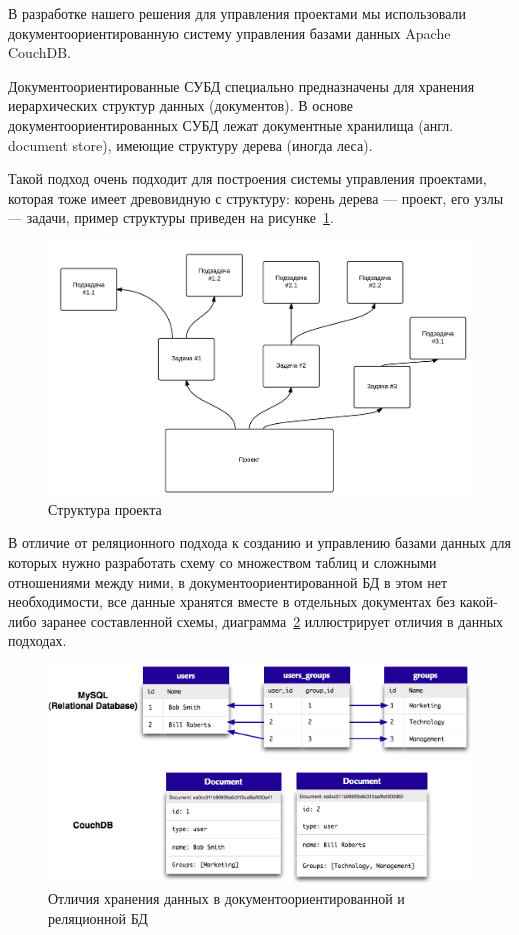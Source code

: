 \documentclass[14pt, a4paper]{extreport}
\begin{document}
В разработке нашего решения для управления проектами мы использовали документоориентированную
систему управления базами данных Apache CouchDB.

Документоориентированные СУБД специально предназначены для хранения иерархических структур
данных (документов). В основе документоориентированных СУБД лежат документные хранилища (англ. document store),
имеющие структуру дерева (иногда леса).

Такой подход очень подходит для построения системы управления проектами, которая тоже имеет древовидную с структуру:
корень дерева --- проект, его узлы --- задачи, пример структуры приведен на рисунке~\ref{fig:project_tree}.

\begin{figure}[!htb]
  \centering
    \includegraphics[scale=0.2]{../slides/images/test_tree.png}
    \caption{Структура проекта}
    \label{fig:project_tree}
\end{figure}

В отличие от реляционного подхода к созданию и управлению базами данных для которых
нужно разработать схему со множеством таблиц и сложными отношениями между ними, в
документоориентированной БД в этом нет необходимости, все данные хранятся вместе в
отдельных документах без какой-либо заранее составленной схемы, диаграмма~\ref{fig:rel_vs_doc}
иллюстрирует отличия в данных подходах.

\begin{figure}[!htb]
  \centering
    \includegraphics[scale=0.6]{pics/rel_vs_doc.png}
    \caption{Отличия хранения данных в документоориентированной и реляционной БД}
    \label{fig:rel_vs_doc}
\end{figure}
\end{document}
